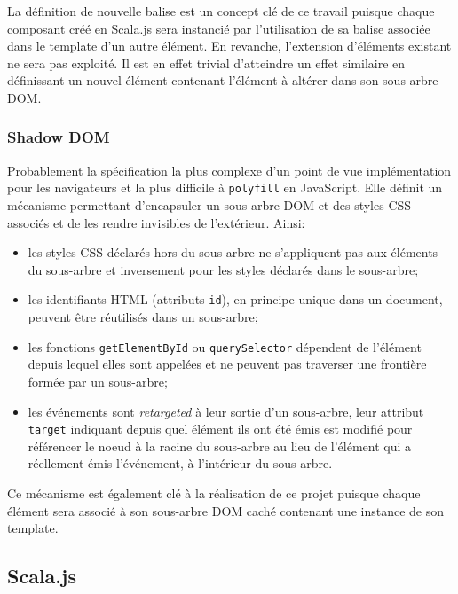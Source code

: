 La définition de nouvelle balise est un concept clé de ce travail puisque chaque composant créé en Scala.js sera instancié par l'utilisation de sa balise associée dans le template d'un autre élément. En revanche, l'extension d'éléments existant ne sera pas exploité. Il est en effet trivial d'atteindre un effet similaire en définissant un nouvel élément contenant l'élément à altérer dans son sous-arbre DOM.

\subsubsection{Shadow DOM}

Probablement la spécification la plus complexe d'un point de vue implémentation pour les navigateurs et la plus difficile à \texttt{polyfill} en JavaScript. Elle définit un mécanisme permettant d'encapsuler un sous-arbre DOM et des styles CSS associés et de les rendre invisibles de l'extérieur. Ainsi:

\begin{itemize}
	\item les styles CSS déclarés hors du sous-arbre ne s'appliquent pas aux éléments du sous-arbre et inversement pour les styles déclarés dans le sous-arbre;
	
	\item les identifiants HTML (attributs \texttt{id}), en principe unique dans un document, peuvent être réutilisés dans un sous-arbre;
	
	\item les fonctions \texttt{getElementById} ou \texttt{querySelector} dépendent de l'élément depuis lequel elles sont appelées et ne peuvent pas traverser une frontière formée par un sous-arbre;
	
	\item les événements sont \emph{retargeted} à leur sortie d'un sous-arbre, leur attribut \texttt{target} indiquant depuis quel élément ils ont été émis est modifié pour référencer le noeud à la racine du sous-arbre au lieu de l'élément qui a réellement émis l'événement, à l'intérieur du sous-arbre.
\end{itemize}

Ce mécanisme est également clé à la réalisation de ce projet puisque chaque élément sera associé à son sous-arbre DOM caché contenant une instance de son template.

\subsection{Scala.js}

